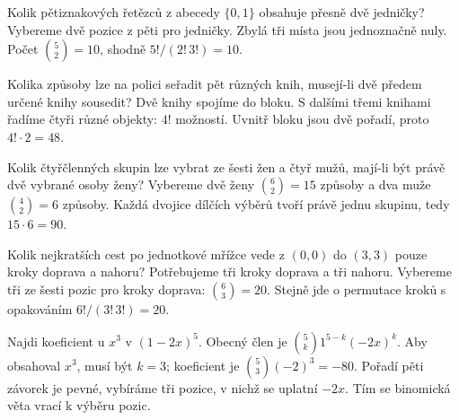 \documentclass[11pt,a4paper]{article}
\begin{document}
\begin{zadaniReseniBox}[title={Úloha C3}]
Kolik pětiznakových řetězců z abecedy $\{0,1\}$ obsahuje přesně dvě jedničky?
\tcblower
Vybereme dvě pozice z pěti pro jedničky. Zbylá tři místa jsou jednoznačně nuly. Počet $\binom52=10$, shodně $5!/(2!\,3!)=10$.
\end{zadaniReseniBox}

\begin{zadaniReseniBox}[title={Úloha C4}]
Kolika způsoby lze na polici seřadit pět různých knih, musejí-li dvě předem určené knihy sousedit?
\tcblower
Dvě knihy spojíme do bloku. S dalšími třemi knihami řadíme čtyři různé objekty: $4!$ možností. Uvnitř bloku jsou dvě pořadí, proto $4!\cdot2=48$.
\end{zadaniReseniBox}

\begin{zadaniReseniBox}[title={Úloha C5}]
Kolik čtyřčlenných skupin lze vybrat ze šesti žen a čtyř mužů, mají-li být právě dvě vybrané osoby ženy?
\tcblower
Vybereme dvě ženy $\binom62=15$ způsoby a dva muže $\binom42=6$ způsoby. Každá dvojice dílčích výběrů tvoří právě jednu skupinu, tedy $15\cdot6=90$.
\end{zadaniReseniBox}

\begin{zadaniReseniBox}[title={Úloha C6}]
Kolik nejkratších cest po jednotkové mřížce vede z $(0,0)$ do $(3,3)$ pouze kroky doprava a nahoru?
\tcblower
Potřebujeme tři kroky doprava a tři nahoru. Vybereme tři ze šesti pozic pro kroky doprava: $\binom63=20$. Stejně jde o permutace kroků s opakováním $6!/(3!\,3!)=20$.
\end{zadaniReseniBox}


\begin{zadaniReseniBox}[title={Úloha B1}]
Najdi koeficient u $x^3$ v $(1-2x)^5$.
\tcblower
Obecný člen je $\binom5k1^{5-k}(-2x)^k$. Aby obsahoval $x^3$, musí být $k=3$; koeficient je $\binom53(-2)^3=-80$. Pořadí pěti závorek je pevné, vybíráme tři pozice, v nichž se uplatní $-2x$. Tím se binomická věta vrací k výběru pozic.
\end{zadaniReseniBox}
\end{document}
